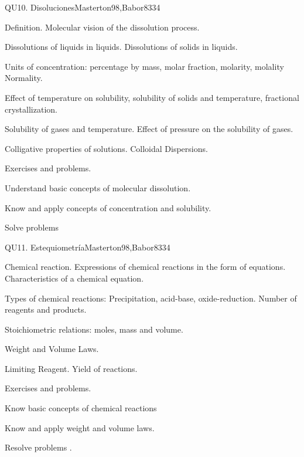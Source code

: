 \begin{syllabus}
\begin{unit}{}{QU10. Disoluciones}{Masterton98,Babor83}{3}{4}
\begin{topics}
      \item Definition. Molecular vision of the dissolution process.
      \item Dissolutions of liquids in liquids. Dissolutions of solids in liquids.
      \item Units of concentration: percentage by mass, molar fraction, molarity, molality Normality.
      \item Effect of temperature on solubility, solubility of solids and temperature, fractional crystallization.
      \item Solubility of gases and temperature. Effect of pressure on the solubility of gases.
      \item Colligative properties of solutions. Colloidal Dispersions.
      \item Exercises and problems.
    \end{topics}

   \begin{learningoutcomes}
      \item Understand basic concepts of molecular  dissolution.
      \item Know and apply concepts of concentration and solubility.
      \item Solve problems
   \end{learningoutcomes}
\end{unit}

\begin{unit}{}{QU11. Estequiometría}{Masterton98,Babor83}{3}{4}
\begin{topics}

      \item Chemical reaction. Expressions of chemical reactions in the form of equations. Characteristics of a chemical equation.
      \item Types of chemical reactions: Precipitation, acid-base, oxide-reduction. Number of reagents and products.
      \item Stoichiometric relations: moles, mass and volume.
      \item Weight and Volume Laws.
      \item Limiting Reagent. Yield of reactions.
      \item Exercises and problems.
    \end{topics}

   \begin{learningoutcomes}

      \item Know basic concepts of chemical reactions
      \item Know and apply weight and volume laws.
      \item Resolve problems .
   \end{learningoutcomes}
\end{unit}



\begin{coursebibliography}
\end{coursebibliography}
\end{syllabus}
